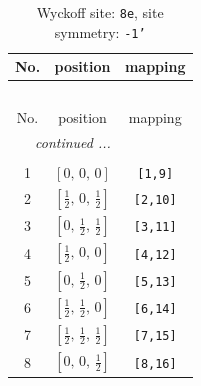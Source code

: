 \documentclass[fleqn,8pt]{jsarticle}
\begin{document}
\renewcommand{\arraystretch}{1.2}
\begin{longtable}{ccc}
\caption{Wyckoff site: {\tt 8e}, site symmetry: {\tt -1'}}
 \\
 \hline \hline
No. & position & mapping \\ \hline \endfirsthead

\multicolumn{2}{l}{\tablename\ \thetable{}} \\
 \hline \hline
No. & position & mapping \\ \hline \endhead

 \hline \hline
\multicolumn{2}{r}{\footnotesize\it continued ...} \\ \endfoot

 \hline \hline
\multicolumn{2}{r}{} \\ \endlastfoot

1 & $\left[ 0,\, 0,\, 0 \right]$ & {\tt [1,9]} \\ \hline
2 & $\left[ \frac{1}{2},\, 0,\, \frac{1}{2} \right]$ & {\tt [2,10]} \\ \hline
3 & $\left[ 0,\, \frac{1}{2},\, \frac{1}{2} \right]$ & {\tt [3,11]} \\ \hline
4 & $\left[ \frac{1}{2},\, 0,\, 0 \right]$ & {\tt [4,12]} \\ \hline
5 & $\left[ 0,\, \frac{1}{2},\, 0 \right]$ & {\tt [5,13]} \\ \hline
6 & $\left[ \frac{1}{2},\, \frac{1}{2},\, 0 \right]$ & {\tt [6,14]} \\ \hline
7 & $\left[ \frac{1}{2},\, \frac{1}{2},\, \frac{1}{2} \right]$ & {\tt [7,15]} \\ \hline
8 & $\left[ 0,\, 0,\, \frac{1}{2} \right]$ & {\tt [8,16]} \\
\end{longtable}
\renewcommand{\arraystretch}{1.2}
\end{document}
